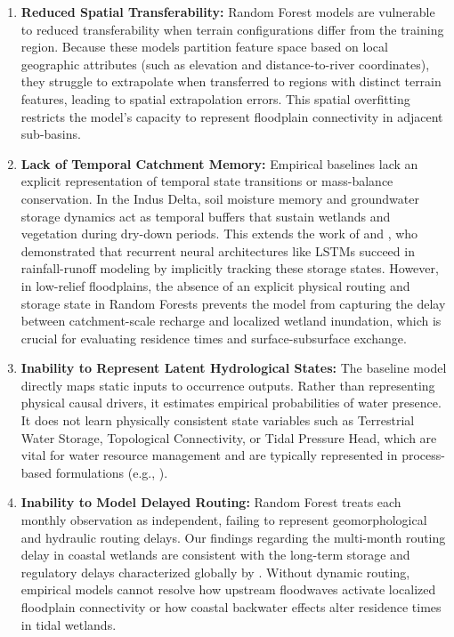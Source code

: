 \documentclass[12pt, a4paper]{article}
\begin{document}
\begin{enumerate}
    \item \textbf{Reduced Spatial Transferability:} Random Forest models are vulnerable to reduced transferability when terrain configurations differ from the training region. Because these models partition feature space based on local geographic attributes (such as elevation and distance-to-river coordinates), they struggle to extrapolate when transferred to regions with distinct terrain features, leading to spatial extrapolation errors. This spatial overfitting restricts the model's capacity to represent floodplain connectivity in adjacent sub-basins.
    \item \textbf{Lack of Temporal Catchment Memory:} Empirical baselines lack an explicit representation of temporal state transitions or mass-balance conservation. In the Indus Delta, soil moisture memory and groundwater storage dynamics act as temporal buffers that sustain wetlands and vegetation during dry-down periods. This extends the work of \citet{Kratzert2018} and \citet{Nearing2020What}, who demonstrated that recurrent neural architectures like LSTMs succeed in rainfall-runoff modeling by implicitly tracking these storage states. However, in low-relief floodplains, the absence of an explicit physical routing and storage state in Random Forests prevents the model from capturing the delay between catchment-scale recharge and localized wetland inundation, which is crucial for evaluating residence times and surface-subsurface exchange.
    \item \textbf{Inability to Represent Latent Hydrological States:} The baseline model directly maps static inputs to occurrence outputs. Rather than representing physical causal drivers, it estimates empirical probabilities of water presence. It does not learn physically consistent state variables such as Terrestrial Water Storage, Topological Connectivity, or Tidal Pressure Head, which are vital for water resource management and are typically represented in process-based formulations (e.g., \citealp{Feng2023The}).
    \item \textbf{Inability to Model Delayed Routing:} Random Forest treats each monthly observation as independent, failing to represent geomorphological and hydraulic routing delays. Our findings regarding the multi-month routing delay in coastal wetlands are consistent with the long-term storage and regulatory delays characterized globally by \citet{Scanlon2023Global}. Without dynamic routing, empirical models cannot resolve how upstream floodwaves activate localized floodplain connectivity or how coastal backwater effects alter residence times in tidal wetlands.
\end{enumerate}
\end{document}
